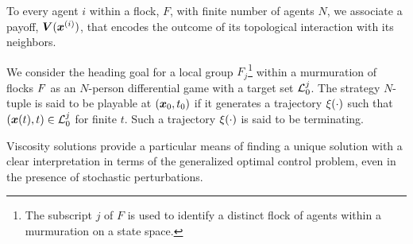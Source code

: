 
\begin{definition}
	To every agent $i$ within a flock, $F$, with finite number of agents $N$, we associate a payoff, $\bm{V}(\bm{x}^{(i)})$, that encodes the outcome of its topological interaction with its neighbors. 
	\label{def:payoff}
\end{definition}
%
%
\begin{definition}
	We consider the heading goal for a local group $F_j$\footnote{The subscript $j$ of $F$ is used to identify a distinct flock of agents within a murmuration on a state space.} within a murmuration of flocks $F$ as  an $N$-person differential game with a target set $\mathcal{L}_0^{j}$. The strategy $N$-tuple is said to be playable at $(\bm{x}_0, t_0)$ if it generates a trajectory $\xi(\cdot)$ such that $(\bm{x}(t), t) \in \mathcal{L}_0^{j}$ for finite $t$. Such a trajectory $\xi(\cdot)$ is said to be terminating.
\end{definition}
%
%
Viscosity solutions provide a particular means of finding a unique solution with a clear interpretation in terms of the generalized optimal control problem, even in the presence of stochastic perturbations. 
%
